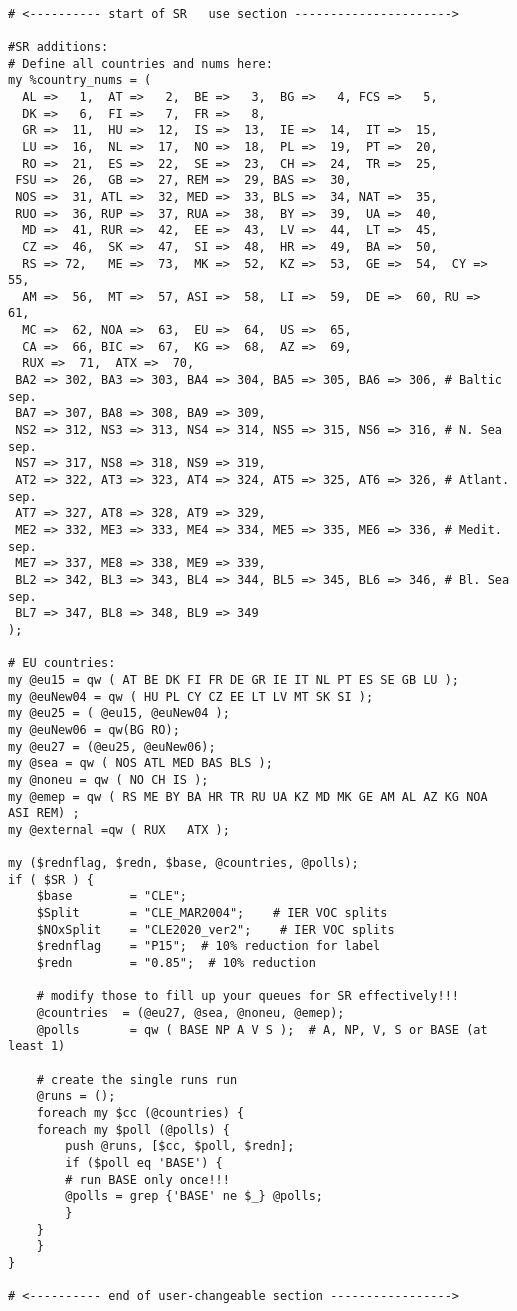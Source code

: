 \begin{verbatim}

# <---------- start of SR   use section ---------------------->

#SR additions:
# Define all countries and nums here:
my %country_nums = (
  AL =>   1,  AT =>   2,  BE =>   3,  BG =>   4, FCS =>   5,
  DK =>   6,  FI =>   7,  FR =>   8,
  GR =>  11,  HU =>  12,  IS =>  13,  IE =>  14,  IT =>  15,
  LU =>  16,  NL =>  17,  NO =>  18,  PL =>  19,  PT =>  20,
  RO =>  21,  ES =>  22,  SE =>  23,  CH =>  24,  TR =>  25,
 FSU =>  26,  GB =>  27, REM =>  29, BAS =>  30,
 NOS =>  31, ATL =>  32, MED =>  33, BLS =>  34, NAT =>  35,
 RUO =>  36, RUP =>  37, RUA =>  38,  BY =>  39,  UA =>  40,
  MD =>  41, RUR =>  42,  EE =>  43,  LV =>  44,  LT =>  45,
  CZ =>  46,  SK =>  47,  SI =>  48,  HR =>  49,  BA =>  50,
  RS => 72,   ME =>  73,  MK =>  52,  KZ =>  53,  GE =>  54,  CY =>  55,
  AM =>  56,  MT =>  57, ASI =>  58,  LI =>  59,  DE =>  60, RU =>  61,
  MC =>  62, NOA =>  63,  EU =>  64,  US =>  65,
  CA =>  66, BIC =>  67,  KG =>  68,  AZ =>  69,
  RUX =>  71,  ATX =>  70,
 BA2 => 302, BA3 => 303, BA4 => 304, BA5 => 305, BA6 => 306, # Baltic sep.
 BA7 => 307, BA8 => 308, BA9 => 309,
 NS2 => 312, NS3 => 313, NS4 => 314, NS5 => 315, NS6 => 316, # N. Sea sep.
 NS7 => 317, NS8 => 318, NS9 => 319,
 AT2 => 322, AT3 => 323, AT4 => 324, AT5 => 325, AT6 => 326, # Atlant. sep.
 AT7 => 327, AT8 => 328, AT9 => 329,
 ME2 => 332, ME3 => 333, ME4 => 334, ME5 => 335, ME6 => 336, # Medit. sep.
 ME7 => 337, ME8 => 338, ME9 => 339,
 BL2 => 342, BL3 => 343, BL4 => 344, BL5 => 345, BL6 => 346, # Bl. Sea sep.
 BL7 => 347, BL8 => 348, BL9 => 349
);

# EU countries:
my @eu15 = qw ( AT BE DK FI FR DE GR IE IT NL PT ES SE GB LU );
my @euNew04 = qw ( HU PL CY CZ EE LT LV MT SK SI );
my @eu25 = ( @eu15, @euNew04 );
my @euNew06 = qw(BG RO);
my @eu27 = (@eu25, @euNew06);
my @sea = qw ( NOS ATL MED BAS BLS );
my @noneu = qw ( NO CH IS );
my @emep = qw ( RS ME BY BA HR TR RU UA KZ MD MK GE AM AL AZ KG NOA ASI REM) ; 
my @external =qw ( RUX   ATX ); 

my ($rednflag, $redn, $base, @countries, @polls);
if ( $SR ) {
    $base        = "CLE";
    $Split       = "CLE_MAR2004";    # IER VOC splits
    $NOxSplit    = "CLE2020_ver2";    # IER VOC splits
    $rednflag    = "P15";  # 10% reduction for label
    $redn        = "0.85";  # 10% reduction

    # modify those to fill up your queues for SR effectively!!!
    @countries  = (@eu27, @sea, @noneu, @emep);
    @polls       = qw ( BASE NP A V S );  # A, NP, V, S or BASE (at least 1)

    # create the single runs run
    @runs = ();
    foreach my $cc (@countries) {
	foreach my $poll (@polls) {
	    push @runs, [$cc, $poll, $redn];
	    if ($poll eq 'BASE') {
		# run BASE only once!!!
		@polls = grep {'BASE' ne $_} @polls;
	    }
	}
    }
}

# <---------- end of user-changeable section ----------------->
\end{verbatim}



